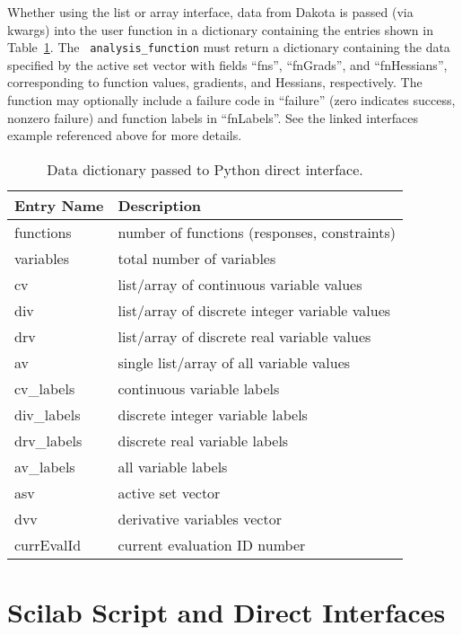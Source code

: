 Whether using the list or array interface, data from Dakota is passed
(via kwargs) into the user function in a dictionary containing the
entries shown in Table~\ref{advint:table:pythonparams}. The {\tt
analysis\_function} must return a dictionary containing the data
specified by the active set vector with fields ``fns'', ``fnGrads'',
and ``fnHessians'', corresponding to function values, gradients, and
Hessians, respectively. The function may optionally include a failure
code in ``failure'' (zero indicates success, nonzero failure) and
function labels in ``fnLabels''. See the linked interfaces example
referenced above for more details.

\begin{table}
\centering
\caption{Data dictionary passed to Python direct interface.}
\label{advint:table:pythonparams}\vspace{2mm}
\begin{tabular}{|l|l|}
\hline
\textbf{Entry Name} & \textbf{Description}  \\
\hline
functions  & number of functions (responses, constraints) \\
variables  & total number of variables \\
cv         & list/array of continuous variable values \\
div        & list/array of discrete integer variable values \\
drv        & list/array of discrete real variable values \\
av         & single list/array of all variable values \\
cv\_labels  & continuous variable labels \\
div\_labels & discrete integer variable labels \\
drv\_labels & discrete real variable labels \\
av\_labels  & all variable labels \\
asv        & active set vector \\
dvv        & derivative variables vector \\
currEvalId & current evaluation ID number \\
\hline
\end{tabular}
\end{table}

\section{Scilab Script and Direct Interfaces}\label{scilab}

